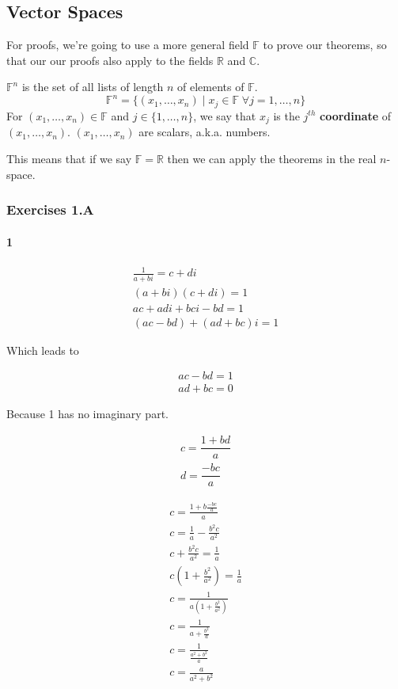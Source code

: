 \subsection{Vector Spaces}

For proofs, we're going to use a more general field $ \mathbb{F} $ to prove our theorems, so that our our proofs also apply to the fields $ \mathbb{R} $ and $ \mathbb{C} $. 

\begin{definition}
	$ \mathbb{F}^n $ is the set of all lists of length $ n $ of elements of $ \mathbb{F} $.
	\[
		\mathbb{F}^n = \{ \left( x_1, \dots, x_n \right) \; | \; x_j \in \mathbb{F} \; \forall j = 1, \dots, n \}
	\]
	For $ (x_1, \dots, x_n) \in \mathbb{F} $ and $ j \in \{ 1, \dots, n \} $, we say that $ x_j $ is the $ j^{th} $ \textbf{coordinate} of $ (x_1, \dots, x_n) $. $ (x_1, \dots, x_n) $ are scalars, a.k.a. numbers.
\end{definition}

This means that if we say $ \mathbb{F} = \mathbb{R} $ then we can apply the theorems in the real $ n $-space.

\subsubsection{Exercises 1.A}

\paragraph{1}

\begin{align*}
	\frac{1}{a+bi} = c+di \\
	(a+bi)(c+di) = 1 \\
	ac + adi + bci - bd = 1 \\
	(ac-bd) + (ad+bc)i = 1
\end{align*}

Which leads to

\begin{align*}
	ac-bd = 1 \\
	ad+bc = 0
\end{align*}

Because 1 has no imaginary part.

\begin{align*}
	c = \dfrac{1+bd}{a} \\
	d = \dfrac{-bc}{a}
\end{align*}

\begin{align*}
	c = \frac{1+b\frac{-bc}{a}}{a} \\
	c =\frac{1}{a} - \frac{b^2c}{a^2} \\
	c + \frac{b^2c}{a^2} = \frac{1}{a} \\
	c\left( 1 + \frac{b^2}{a^2} \right) = \frac{1}{a} \\
	c = \frac{1}{a\left( 1 + \frac{b^2}{a^2} \right)} \\
	c = \frac{1}{a + \frac{b^2}{a}} \\
	c = \frac{1}{\frac{a^2+b^2}{a}} \\
	c = \frac{a}{a^2+b^2}
\end{align*}





